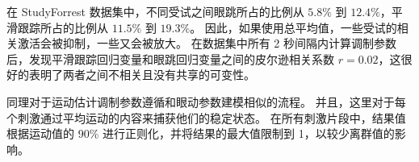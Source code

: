 
在 StudyForrest 数据集中，不同受试之间眼跳所占的比例从 $5.8\%$ 到 $12.4\%$，平滑跟踪所占的比例从 $11.5\%$ 到 $19.3\%$。
因此，如果使用总平均值，一些受试的相关激活会被抑制，一些又会被放大。
在数据集中所有 2 秒间隔内计算调制参数后，发现平滑跟踪回归变量和眼跳回归变量之间的皮尔逊相关系数 $r=0.02$，这很好的表明了两者之间不相关且没有共享的可变性。

同理对于运动估计调制参数遵循和眼动参数建模相似的流程。
并且，这里对于每个刺激通过平均运动的内容来捕获他们的稳定状态。
在所有刺激片段中，结果值根据运动值的 90\% 进行正则化，并将结果的最大值限制到 1，以较少离群值的影响。




